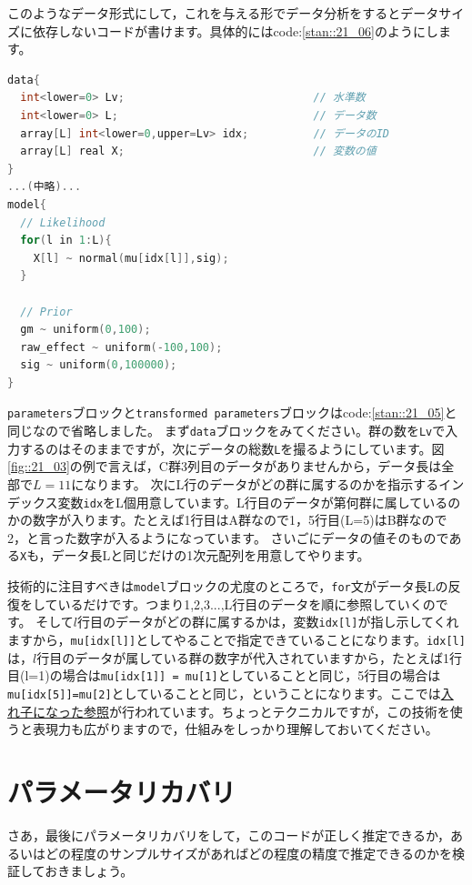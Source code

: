 \documentclass{ltjsbook}
\begin{document}
このようなデータ形式にして，これを与える形でデータ分析をするとデータサイズに依存しないコードが書けます。具体的にはcode:\ref{stan::21_06}のようにします。
\begin{lstlisting}[language=C++,label={stan::21_06},caption={整然データに対応したコード}]
data{
  int<lower=0> Lv;                             // 水準数
  int<lower=0> L;                              // データ数
  array[L] int<lower=0,upper=Lv> idx;          // データのID
  array[L] real X;                             // 変数の値
}
...(中略)...
model{
  // Likelihood
  for(l in 1:L){
    X[l] ~ normal(mu[idx[l]],sig);
  }
    
  // Prior
  gm ~ uniform(0,100);
  raw_effect ~ uniform(-100,100);
  sig ~ uniform(0,100000);
}
\end{lstlisting}

\verb|parameters|ブロックと\verb|transformed parameters|ブロックはcode:\ref{stan::21_05}と同じなので省略しました。
まず\verb|data|ブロックをみてください。群の数を\verb|Lv|で入力するのはそのままですが，次にデータの総数\verb|L|を撮るようにしています。図\ref{fig::21_03}の例で言えば，C群3列目のデータがありませんから，データ長は全部で$L=11$になります。
次にL行のデータがどの群に属するのかを指示するインデックス変数\verb|idx|をL個用意しています。L行目のデータが第何群に属しているのかの数字が入ります。たとえば1行目はA群なので1，5行目(L=5)はB群なので2，と言った数字が入るようになっています。
さいごにデータの値そのものである\verb|X|も，データ長Lと同じだけの1次元配列を用意してやります。

技術的に注目すべきは\verb|model|ブロックの尤度のところで，\verb|for|文がデータ長Lの反復をしているだけです。つまり1,2,3...,L行目のデータを順に参照していくのです。
そして$l$行目のデータがどの群に属するかは，変数\verb|idx[l]|が指し示してくれますから，\verb|mu[idx[l]]|としてやることで指定できていることになります。\verb|idx[l]|は，$l$行目のデータが属している群の数字が代入されていますから，たとえば1行目(l=1)の場合は\verb|mu[idx[1]] = mu[1]|としていることと同じ，5行目の場合は\verb|mu[idx[5]]=mu[2]|としていることと同じ，ということになります。ここでは\underline{入れ子になった参照}が行われています。ちょっとテクニカルですが，この技術を使うと表現力も広がりますので，仕組みをしっかり理解しておいてください。

\section{パラメータリカバリ}
さあ，最後にパラメータリカバリをして，このコードが正しく推定できるか，あるいはどの程度のサンプルサイズがあればどの程度の精度で推定できるのかを検証しておきましょう。
\end{document}
